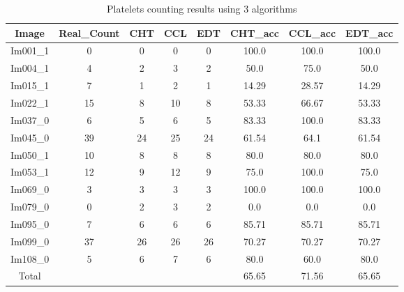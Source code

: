 \begin{table}[H]
\centering
\begin{tabular}{|c|c|c|c|c|c|c|c|}
\hline
 \textbf{Image} & \textbf{Real\_Count} & \textbf{CHT} & \textbf{CCL} & \textbf{EDT} & \textbf{CHT\_acc} & \textbf{CCL\_acc} & \textbf{EDT\_acc} \\ \hline
 Im001\_1 & 0 & 0 & 0 & 0 & 100.0 & 100.0 & 100.0 \\ 
 Im004\_1 & 4 & 2 & 3 & 2 & 50.0 & 75.0 & 50.0 \\ 
 Im015\_1 & 7 & 1 & 2 & 1 & 14.29 & 28.57 & 14.29 \\ 
 Im022\_1 & 15 & 8 & 10 & 8 & 53.33 & 66.67 & 53.33 \\ 
 Im037\_0 & 6 & 5 & 6 & 5 & 83.33 & 100.0 & 83.33 \\ 
 Im045\_0 & 39 & 24 & 25 & 24 & 61.54 & 64.1 & 61.54 \\ 
 Im050\_1 & 10 & 8 & 8 & 8 & 80.0 & 80.0 & 80.0 \\ 
 Im053\_1 & 12 & 9 & 12 & 9 & 75.0 & 100.0 & 75.0 \\ 
 Im069\_0 & 3 & 3 & 3 & 3 & 100.0 & 100.0 & 100.0 \\ 
 Im079\_0 & 0 & 2 & 3 & 2 & 0.0 & 0.0 & 0.0 \\ 
 Im095\_0 & 7 & 6 & 6 & 6 & 85.71 & 85.71 & 85.71 \\ 
 Im099\_0 & 37 & 26 & 26 & 26 & 70.27 & 70.27 & 70.27 \\ 
 Im108\_0 & 5 & 6 & 7 & 6 & 80.0 & 60.0 & 80.0 \\ \hline
 Total &   &   &   &   & 65.65 & 71.56 & 65.65 \\ 

\hline
\end{tabular}
\caption{Platelets counting results using 3 algorithms}
\label{Platelets counting results using 3 algorithms}
\end{table}
